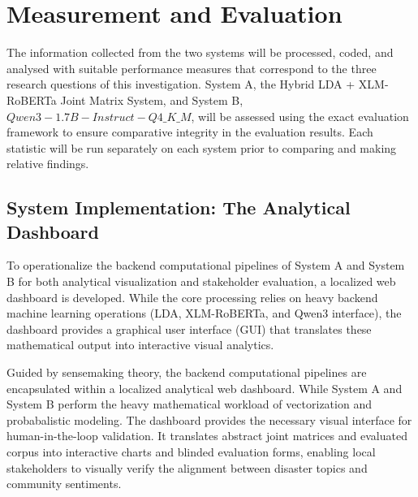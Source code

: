 \documentclass[12pt,a4paper]{report}
\begin{document}
\section{Measurement and Evaluation}

The information collected from the two systems will be processed, coded, and
analysed with suitable performance measures that correspond to the three
research questions of this investigation. System A, the Hybrid LDA + XLM-RoBERTa Joint
Matrix System, and System B, $Qwen3-1.7B-Instruct-Q4\_K\_M$, will be assessed using the exact evaluation
framework to ensure comparative integrity in the evaluation results. Each
statistic will be run separately on each system prior to comparing and making
relative findings.

\subsection{System Implementation: The Analytical Dashboard}

To operationalize the backend computational pipelines of System A and System B for both analytical visualization
and stakeholder evaluation, a localized web dashboard is developed. While the core processing relies on heavy backend machine learning operations (LDA, XLM-RoBERTa, and Qwen3 interface), the dashboard provides a graphical user interface (GUI) that translates these mathematical output into interactive visual analytics.

Guided by sensemaking theory, the backend computational pipelines are encapsulated within a localized analytical web dashboard. While System A and System B perform the heavy mathematical workload of vectorization and probabalistic modeling. The dashboard provides the necessary visual interface for human-in-the-loop validation. It translates abstract joint matrices and evaluated corpus into interactive charts and blinded evaluation forms, enabling local stakeholders to visually verify the alignment between disaster topics and community sentiments.
\end{document}
